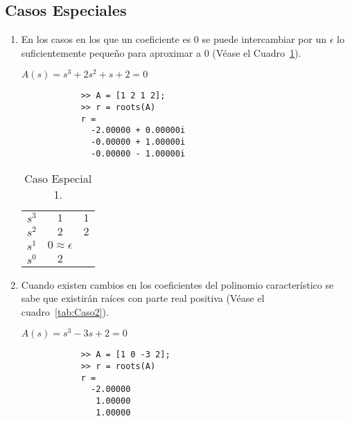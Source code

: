     \subsection{Casos Especiales}
        \begin{enumerate}

            \item En los casos en los que un coeficiente es $0$ se puede intercambiar por un $\epsilon$ lo suficientemente pequeño para aproximar a $0$ (Véase el Cuadro~\ref{tab:Caso1}).

            \begin{math}
            A(s) = s^3 + 2 s^2 + s + 2 = 0
            \end{math}

            \begin{verbatim}
            >> A = [1 2 1 2];
            >> r = roots(A)
            r =
              -2.00000 + 0.00000i
              -0.00000 + 1.00000i
              -0.00000 - 1.00000i
            \end{verbatim}

            \begin{table}[htbp]
                \centering
                \begin{tabular}{c|c c}
                $s^3$ & $1$ & $1$ \\
                $s^2$ & $2$ & $2$ \\
                $s^1$ & $0 \approx \epsilon$ \\
                $s^0$ & $2$
                \end{tabular}
            \caption{\label{tab:Caso1}Caso Especial 1.}
            \end{table}

            \item Cuando existen cambios en los coeficientes del polinomio característico se sabe que existirán raíces con parte real positiva (Véase el cuadro~\ref{tab:Caso2}).

            \begin{math}
                A(s) = s^3 - 3 s + 2 = 0
            \end{math}

            \begin{verbatim}
            >> A = [1 0 -3 2];
            >> r = roots(A)
            r =
              -2.00000
               1.00000
               1.00000
            \end{verbatim}


\end{enumerate}
